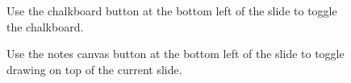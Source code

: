 \documentclass[
  letterpaper,
  DIV=11,
  numbers=noendperiod]{scrartcl}
\begin{document}
\begin{figure}

\begin{minipage}[t]{0.05\linewidth}

{\centering 


}

\end{minipage}%
%
\begin{minipage}[t]{0.95\linewidth}

{\centering 

Use the chalkboard button at the bottom left of the slide to toggle the
chalkboard.

}

\end{minipage}%

\end{figure}

\begin{figure}

\begin{minipage}[t]{0.05\linewidth}

{\centering 


}

\end{minipage}%
%
\begin{minipage}[t]{0.95\linewidth}

{\centering 

Use the notes canvas button at the bottom left of the slide to toggle
drawing on top of the current slide.

}

\end{minipage}%

\end{figure}
\end{document}
